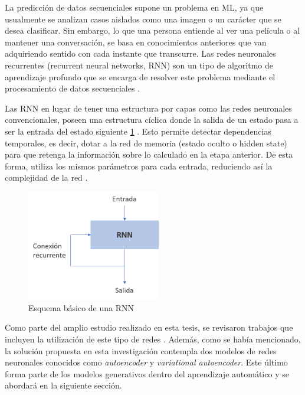 
La predicción de datos secuenciales supone un problema en ML, ya que usualmente se analizan casos aislados como una imagen o un carácter que se desea clasificar. Sin embargo, lo que una persona entiende al ver una película o al mantener una conversación, se basa en conocimientos anteriores que van adquiriendo sentido con cada instante que transcurre. Las redes neuronales recurrentes (recurrent neural networks, RNN) son un tipo de algoritmo de aprendizaje profundo que se encarga de resolver este problema mediante el procesamiento de datos secuenciales \cite{BengioGood}.

Las RNN en lugar de tener una estructura por capas como las redes neuronales convencionales, poseen una estructura cíclica donde la salida de un estado pasa a ser la entrada del estado siguiente \ref{RNN} . Esto permite detectar dependencias temporales, es decir, dotar a la red de memoria (estado oculto o hidden state) para que retenga la información sobre lo calculado en la etapa anterior. De esta forma, utiliza los mismos parámetros para cada entrada, reduciendo así la complejidad de la red \cite{RNNVinyals}.

\begin{figure}[!h]
	
	\centering
	
	\includegraphics[width=2.3in]{Graphics/RNNConnection.png}
	
	\caption{\small{Esquema básico de una RNN}}
	\label{RNN}
	
\end{figure}

Como parte del amplio estudio realizado en esta tesis, se revisaron trabajos que incluyen la utilización de este tipo de redes \cite{SutskeverSeq2seqNN, PointerNVinyals}. Además, como se había mencionado, la solución propuesta en esta investigación contempla dos modelos de redes neuronales conocidos como \textit{autoencoder} y \textit{variational autoencoder}. Este último forma parte de los modelos generativos dentro del aprendizaje automático y se abordará en la siguiente sección.


